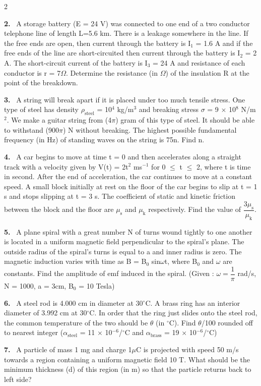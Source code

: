 \documentclass[10pt]{extarticle}
\newcommand{\qn}[1]{\par\smallskip\noindent\textbf{#1.}~}
\begin{document}
\begin{multicols}{2}
\qn{2} A storage battery (E = 24 V) was connected to one end of a two conductor telephone line of length L=5.6 km. There is a leakage somewhere in the line. If the free ends are open, then current through the battery is I$_1$ = 1.6 A and if the free ends of the line are short-circuited then current through the battery is I$_2$ = 2 A. The short-circuit current of the battery is I$_3$ = 24 A and resistance of each conductor is r = 7$\Omega$. Determine the resistance (in $\Omega$) of the insulation R at the point of the breakdown.
\qn{3} A string will break apart if it is placed under too much tensile stress. One type of steel has density $\rho_{\mathrm{steel}}$ = 10$^4$ kg/m$^3$ and breaking stress $\sigma$ = 9 $\times$ 10$^8$ N/m$^2$. We make a guitar string from (4$\pi$) gram of this type of steel. It should be able to withstand (900$\pi$) N without breaking. The highest possible fundamental frequency (in Hz) of standing waves on the string is 75n. Find n.
\qn{4} A car begins to move at time t = 0 and then accelerates along a straight track with a velocity given by V(t) = 2t$^2$ ms$^{-1}$ for 0 $\leq$ t $\leq$ 2, where t is time in second. After the end of acceleration, the car continues to move at a constant speed. A small block initially at rest on the floor of the car begins to slip at t = 1 s and stops slipping at t = 3 s. The coefficient of static and kinetic friction between the block and the floor are $\mu_\mathrm s$ and $\mu_\mathrm k$ respectively. Find the value of $\dfrac{3\mu_\mathrm s}{\mu_\mathrm k}$.
\qn{5} A plane spiral with a great number N of turns wound tightly to one another is located in a uniform magnetic field perpendicular to the spiral's plane. The outside radius of the spiral's turns is equal to a and inner radius is zero. The magnetic induction varies with time as B = B$_0$ sin$\omega$t, where B$_0$ and $\omega$ are constants. Find the amplitude of emf induced in the spiral. (Given : $\omega=\dfrac1\pi$ rad/s, N = 1000, a = 3cm, B$_0$ = 10 Tesla)
\qn{6} A steel rod is 4.000 cm in diameter at 30$^\circ$C. A brass ring has an interior diameter of 3.992 cm at 30$^\circ$C. In order that the ring just slides onto the steel rod, the common temperature of the two should be $\theta$ (in $^\circ$C). Find $\theta$/100 rounded off to nearest integer ($\alpha_{\mathrm{steel}}$ = 11 $\times$ 10$^{-6}$/$^\circ$C and $\alpha_{\mathrm{brass}}$ = 19 $\times$ 10$^{-6}$/$^\circ$C)
\qn{7} A particle of mass 1 mg and charge 1$\mu$C is projected with speed 50 m/s towards a region containing a uniform magnetic field 10 T. What should be the minimum thickness (d) of this region (in m) so that the particle returns back to left side?\par

\end{multicols}
\end{document}
